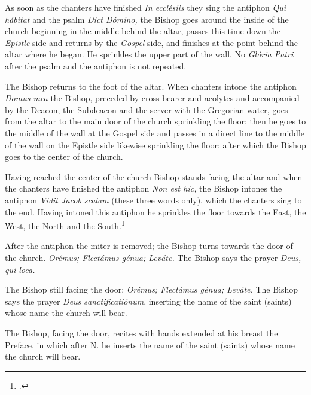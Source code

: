 \documentclass[letterpaper]{report}
\begin{document}
{    \rubric As soon as the chanters have finished \textit{In eccl\'esiis} they
    sing the antiphon \textit{Qui h\'abitat} and the psalm \textit{Dict
    D\'omino,} the Bishop goes around the inside of the church beginning in the
    middle behind the altar, passes this time down the \textit{Epistle} side
    and returns by the \textit{Gospel} side, and finishes at the point behind
    the altar where he began. He sprinkles the upper part of the wall. No
    \textit{Glória Patri} after the psalm and the antiphon is not repeated.

    \rubric The Bishop returns to the foot of the altar. When chanters intone
    the antiphon \textit{Domus mea} the Bishop, preceded by cross-bearer and
    acolytes and accompanied by the Deacon, the Subdeacon and the server with
    the Gregorian water, goes from the altar to the main door of the church
    sprinkling the floor; then he goes to the middle of the wall at the Gospel
    side and passes in a direct line to the middle of the wall on the Epistle
    side likewise sprinkling the floor; after which the Bishop goes to the
    center of the church.

    \rubric Having reached the center of the church Bishop stands facing the
    altar and when the chanters have finished the antiphon \textit{Non est
    hic,} the Bishop intones the antiphon \textit{Vidit Jacob scalam} (these
    three words only), which the chanters sing to the end. Having intoned this
    antiphon he sprinkles the floor towards the East, the West, the North and
    the South.\footcite[The Rubric in the \textit{Pontificale Romanum} supposes
    the altar to be towards the East; the bishop, therefore, sprinkles the
    floor before him, behind him, at his left and than at his right.][footnote
    1, p. 74.]{consecranda}

    \rubric After the antiphon the miter is removed; the Bishop turns towards
    the door of the church. \textit{Orémus; Flectámus génua; Leváte.} The
    Bishop says the prayer \textit{Deus, qui loca.}

    \rubric The Bishop still facing the door: \textit{Orémus; Flectámus génua;
    Leváte.} The Bishop says the prayer \textit{Deus sanctificatiónum},
    inserting the name of the saint (saints) whose name the church will bear.

    \rubric The Bishop, facing the door, recites with hands extended at his
    breast the Preface, in which after N. he inserts the name of the saint
    (saints) whose name the church will bear.

}
\end{document}
